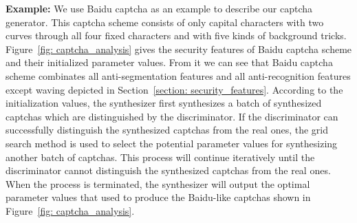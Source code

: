 \noindent \textbf{Example:}
We use Baidu captcha as an example to describe our captcha generator. This captcha scheme consists of only capital characters with two curves through all four fixed characters and with five kinds of background tricks. Figure~\ref{fig: captcha_analysis} gives the security features of Baidu captcha scheme and their initialized parameter values. From it we can see that Baidu captcha scheme combinates all anti-segmentation features and all anti-recognition features except waving depicted in Section~\ref{section: security_features}. According to the initialization values, the synthesizer first synthesizes a batch of synthesized captchas which are distinguished by the discriminator. If the discriminator can successfully distinguish the synthesized captchas from the real ones, the grid search method is used to select the potential parameter values for synthesizing another batch of captchas. This process will continue iteratively until the discriminator cannot distinguish the synthesized captchas from the real ones. When the process is terminated, the synthesizer will output the optimal parameter values that used to produce the Baidu-like captchas shown in Figure~\ref{fig: captcha_analysis}.

